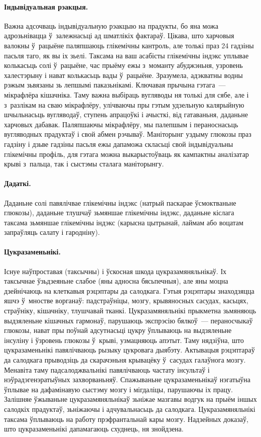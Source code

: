 \paragraph{Індывідуальная рэакцыя.}
Важна адсочваць індывідуальную рэакцыю на прадукты, бо яна можа адрозьнівацца ў~залежнасьці ад шматлікіх фактараў. Цікава, што харчовыя валокны ў~рацыёне паляпшаюць глікемічны кантроль, але толькі праз 24 гадзіны пасьля таго, як вы іх зьелі. Таксама на ваш асабісты глікемічны індэкс уплывае колькасьць солі ў~рацыёне, час прыёму ежы з~моманту абуджэньня, узровень халестэрыну і нават колькасьць вады ў~рацыёне. Зразумела, адэкватны водны рэжым зьвязаны зь лепшымі паказьнікамі. Ключавая прычына гэтага~--- мікрафлёра кішачніка. Таму важна выбіраць вугляводы ня толькі для сябе, але і з~разлікам на сваю мікрафлёру, улічваючы пры гэтым удзельную калярыйную шчыльнасьць вугляводаў, ступень апрацоўкі і ачысткі, від гатаваньня, даданьне харчовых дабавак. Паляпшаючы мікрафлёру, мы палепшым і пераноснасьць вугляводных прадуктаў і свой абмен рэчываў. Маніторынг уздыму глюкозы праз гадзіну і дзьве гадзіны пасьля ежы дапаможа скласьці свой індывідуальны глікемічны профіль, для гэтага можна выкарыстоўваць як кампактны аналізатар крыві з~пальца, так і сыстэмы сталага маніторынгу.

\paragraph{Дадаткі.}
Даданьне солі павялічвае глікемічны індэкс (натрый паскарае ўсмоктваньне глюкозы), даданьне тлушчаў зьмяншае глікемічны індэкс, даданьне кіслага таксама зьмяншае глікемічны індэкс (карысна цытрынай, лаймам або воцатам запраўляць салату і гародніну).

\paragraph{Цукразаменьнікі.}
Існуе наўпроставая (таксычны) і ўскосная шкода цукразамяняльнікаў. Іх таксычнае ўзьдзеяньне слабое (яны адносна бясьпечныя), але яны моцна дзейнічаюць на клеткавыя рэцэптары да салодкага. Гэтыя рэцэптары знаходзяцца яшчэ ў~мностве ворганаў: падстраўніцы, мозгу, крывяносных сасудах, касьцях, страўніку, кішачніку, тлушчавай тканкі. Цукразамяняльнікі прыкметна зьмяняюць выдзяленьне кішачных гармонаў, парушаюць экспрэсію бялкоў~--- пераносчыкаў глюкозы, нават пры поўнай адсутнасьці цукру ўплываюць на выдзяленьне інсуліну і ўзровень глюкозы ў~крыві, узмацняюць апэтыт. Таму нядзіўна, што цукразаменьнікі павялічваюць рызыку цукровага дыябэту. Актывацыя рэцэптараў да салодкага прыводзіць да скарачэньня крывацёку ў~сасудах галаўнога мозгу. Менавіта таму падсалоджвальнікі павялічваюць частату інсультаў і нэўрадэгенэратыўных захворваньняў. Спажываньне цукразаменьнікаў нэгатыўна ўплывае на дафамінавую сыстэму мозгу і мігдаліцы, парушаючы іх працу. Залішняе ўжываньне цукразамяняльнікаў зьніжае мазгавы водгук на прыём іншых салодкіх прадуктаў, зьніжаючы і адчувальнасьць да салодкага. Цукразамяняльнікі таксама ўплываюць на работу прэфрантальнай кары мозгу. Надзейных доказаў, што цукразаменьнікі дапамагаюць схуднець, ня знойдзена.

